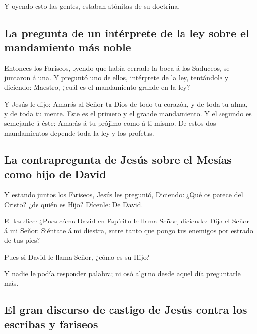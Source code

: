  Y oyendo esto las gentes, estaban atónitas de su
doctrina.

\hypertarget{la-pregunta-de-un-intuxe9rprete-de-la-ley-sobre-el-mandamiento-muxe1s-noble}{%
\subsection{La pregunta de un intérprete de la ley sobre el mandamiento
más
noble}\label{la-pregunta-de-un-intuxe9rprete-de-la-ley-sobre-el-mandamiento-muxe1s-noble}}

 Entonces los Fariseos, oyendo que había cerrado la boca
á los Saduceos, se juntaron á una.  Y preguntó uno de
ellos, intérprete de la ley, tentándole y diciendo: 
Maestro, ¿cuál es el mandamiento grande en la ley?

 Y Jesús le dijo: Amarás al Señor tu Dios de todo tu
corazón, y de toda tu alma, y de toda tu mente.  Este es
el primero y el grande mandamiento.  Y el segundo es
semejante á éste: Amarás á tu prójimo como á ti mismo. 
De estos dos mandamientos depende toda la ley y los profetas.

\hypertarget{la-contrapregunta-de-jesuxfas-sobre-el-mesuxedas-como-hijo-de-david}{%
\subsection{La contrapregunta de Jesús sobre el Mesías como hijo de
David}\label{la-contrapregunta-de-jesuxfas-sobre-el-mesuxedas-como-hijo-de-david}}

 Y estando juntos los Fariseos, Jesús les preguntó,
 Diciendo: ¿Qué os parece del Cristo? ¿de quién es Hijo?
Dícenle: De David.

 El les dice: ¿Pues cómo David en Espíritu le llama
Señor, diciendo:  Dijo el Señor á mi Señor: Siéntate á mi
diestra, entre tanto que pongo tus enemigos por estrado de tus pies?

 Pues si David le llama Señor, ¿cómo es su Hijo?

 Y nadie le podía responder palabra; ni osó alguno desde
aquel día preguntarle más.

\hypertarget{el-gran-discurso-de-castigo-de-jesuxfas-contra-los-escribas-y-fariseos}{%
\subsection{El gran discurso de castigo de Jesús contra los escribas y
fariseos}\label{el-gran-discurso-de-castigo-de-jesuxfas-contra-los-escribas-y-fariseos}}

